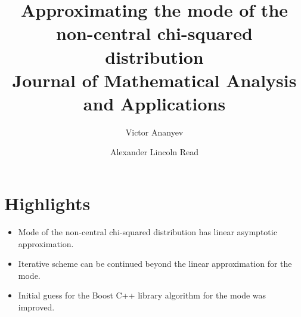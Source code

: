 \documentclass{article}
\title{Approximating the mode of the non-central chi-squared distribution \\[1ex] \large Journal of Mathematical Analysis and Applications}
\author{Victor Ananyev \and Alexander Lincoln Read}
\begin{document}
\maketitle

\section{Highlights}

\begin{itemize}
\item Mode of the non-central chi-squared distribution has linear asymptotic approximation.
\item Iterative scheme can be continued beyond the linear approximation for the mode.
\item Initial guess for the Boost C++ library algorithm for the mode was improved.
\end{itemize}
\end{document}
